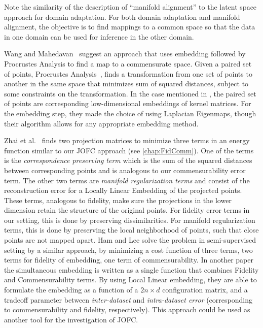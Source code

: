 \documentclass[12pt,oneside,final]{thesis}
\begin{document}
Note the similarity of the  description of ``manifold alignment''   to the latent space approach for domain adaptation. For both domain adaptation and manifold alignment, the objective is to find mappings to a  common space  so that the data in  one domain can be used for inference in the other domain.

Wang and Mahedavan~\cite{Wang2008} suggest an  approach that uses embedding followed by Procrustes Analysis to find a map to a commensurate space. Given a paired set of points, Procrustes Analysis~\cite{Sibson}, finds a transformation from one set of points to another in the same space that minimizes sum of squared distances, subject to some constraints on the transformation. In the case mentioned in \cite{Wang2008}, the paired set of points are corresponding low-dimensional embeddings of kernel matrices.   For the embedding step, they made the choice of using Laplacian Eigenmaps, though their algorithm allows for any appropriate embedding method.

 Zhai et al.~\cite{Zhai2010}  finds two projection matrices to minimize three terms in an energy function similar to our JOFC approach (see \autoref{chap:FidComm}). One of the terms is the \emph{correspondence preserving term} which is the sum of the squared distances between corresponding points and is analogous to our commensurability error term. The other two terms are \emph{manifold regularization terms} and consist of the reconstruction error for a Locally Linear Embedding of the projected points. These terms, analogous to fidelity, make sure the projections in the lower dimension retain the structure of the original points. For fidelity error terms in our setting, this is done by preserving dissimilarities. For manifold regularization terms, this is done by preserving the local neighborhood of points, such that close points are not mapped apart.
Ham and Lee\cite{HamLee2005a} solve the problem in semi-supervised setting by a similar approach, by minimizing a cost function of three terms, two terms for fidelity of embedding, one term of commensurability.
In another paper  the simultaneous embedding is written  as a single function  that combines Fidelity and Commensurability terms. By using Local Linear embedding,  they are able to formulate the embedding as a function of a $2n \times d$ configuration matrix, and a tradeoff parameter between \emph{inter-dataset} and \emph{intra-dataset error} (corresponding to commensurability and fidelity, respectively). This approach could be used as another tool for the investigation of JOFC.
\end{document}
